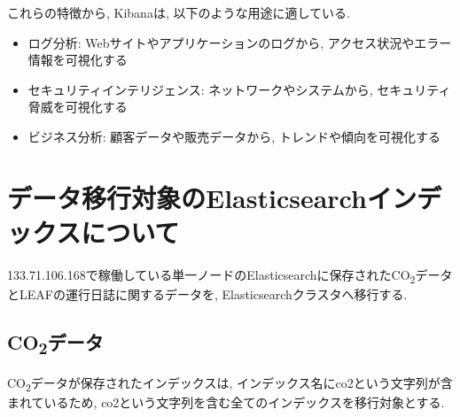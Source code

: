 これらの特徴から, Kibanaは, 以下のような用途に適している.

\begin{itemize}
  \item ログ分析: Webサイトやアプリケーションのログから, アクセス状況やエラー情報を可視化する
  \item セキュリティインテリジェンス: ネットワークやシステムから, セキュリティ脅威を可視化する
  \item ビジネス分析: 顧客データや販売データから, トレンドや傾向を可視化する
\end{itemize}




\section{データ移行対象のElasticsearchインデックスについて}

133.71.106.168で稼働している単一ノードのElasticsearchに保存されたCO\textsubscript{2}データとLEAFの運行日誌に関するデータを, Elasticsearchクラスタへ移行する.

\subsection{CO\textsubscript{2}データ}

CO\textsubscript{2}データが保存されたインデックスは, インデックス名にco2という文字列が含まれているため, co2という文字列を含む全てのインデックスを移行対象とする.

